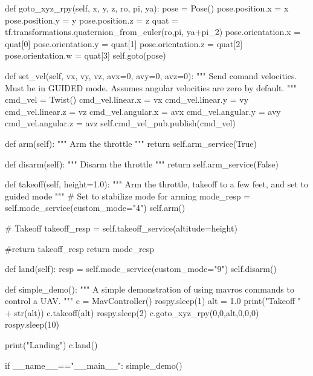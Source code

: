 \documentclass[a4paper,12pt]{article}
\begin{document}
\begin{MyCode}
	def goto_xyz_rpy(self, x, y, z, ro, pi, ya):
		pose = Pose()
		pose.position.x = x
		pose.position.y = y
		pose.position.z = z
		quat = tf.transformations.quaternion_from_euler(ro,pi,
		 					     ya+pi_2)
		pose.orientation.x = quat[0]
		pose.orientation.y = quat[1]
		pose.orientation.z = quat[2]
		pose.orientation.w = quat[3]
		self.goto(pose)
		
	def set_vel(self, vx, vy, vz, avx=0, avy=0, avz=0):
		"""
		Send comand velocities. Must be in GUIDED mode.
		Assumes angular velocities are zero by default.
		"""
		cmd_vel = Twist()
		cmd_vel.linear.x = vx
		cmd_vel.linear.y = vy
		cmd_vel.linear.z = vz
		cmd_vel.angular.x = avx
		cmd_vel.angular.y = avy
		cmd_vel.angular.z = avz
		self.cmd_vel_pub.publish(cmd_vel)
		
	def arm(self):
		"""
		Arm the throttle
		"""
		return self.arm_service(True)
		
	def disarm(self):
		"""
		Disarm the throttle
		"""
		return self.arm_service(False)
		
	def takeoff(self, height=1.0):
		"""
		Arm the throttle, takeoff to a few feet, and
		set to guided mode
		"""
		# Set to stabilize mode for arming
		mode_resp = self.mode_service(custom_mode="4")
		self.arm()
	
		# Takeoff
		takeoff_resp = self.takeoff_service(altitude=height)
		
		#return takeoff_resp
		return mode_resp
		
	def land(self):	
		resp = self.mode_service(custom_mode="9")
		self.disarm()
	
def simple_demo():
	"""
	A simple demonstration of using
	mavros commands to control a UAV.
	"""
	c = MavController()
	rospy.sleep(1)
	alt = 1.0
	print("Takeoff " + str(alt))
	c.takeoff(alt)
	rospy.sleep(2)
	c.goto_xyz_rpy(0,0,alt,0,0,0)
	rospy.sleep(10)
	
	print("Landing")
	c.land()
	
if __name__=="__main__":
	simple_demo()

\end{MyCode}
\end{document}
